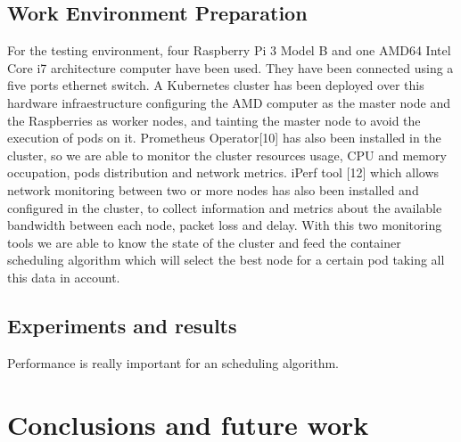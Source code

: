 \documentclass[conference]{IEEEtran}
\begin{document}
\subsection{Work Environment Preparation}\label{sec:env}


For the testing environment, four Raspberry Pi 3 Model B and one AMD64 Intel Core i7 architecture computer have been used. They have been connected using a five 
ports ethernet switch. A Kubernetes cluster has been deployed over this hardware infraestructure configuring the AMD computer as the master node and
the Raspberries as worker nodes, and tainting the master node to avoid the execution of pods on it. Prometheus Operator[10] 
has also been installed in the cluster, so we are able to monitor the cluster resources usage, CPU and memory occupation, pods distribution and network metrics.
iPerf tool [12] which allows network monitoring between two or more nodes has also been installed and configured in the cluster, to collect information and metrics
about the available bandwidth between each node, packet loss and delay. With this two monitoring tools we are able to know the state of the cluster and feed the
container scheduling algorithm which will select the best node for a certain pod taking all this data in account.



\subsection{Experiments and results}\label{sec:expe}



Performance is really important for an scheduling algorithm.


\section{Conclusions and future work}\label{sec:conc}
\end{document}
